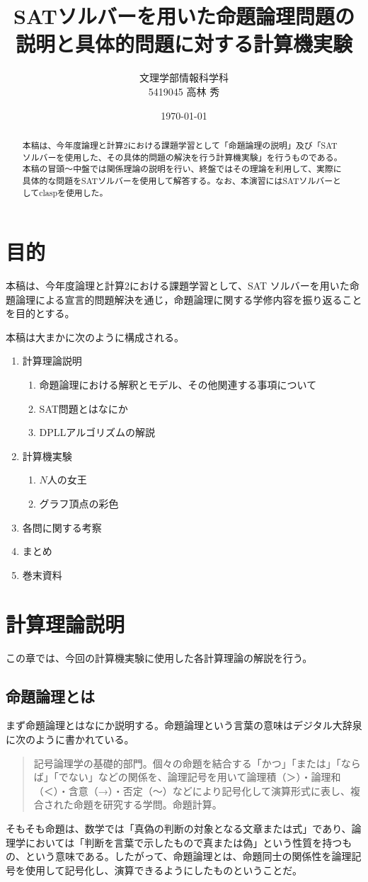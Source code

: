 \documentclass[dvipdfmx]{jsarticle}
\title{SATソルバーを用いた命題論理問題の説明と具体的問題に対する計算機実験}
\author{文理学部情報科学科\\5419045 高林 秀}
\date{\today}
\begin{document}
\maketitle

\begin{abstract}
本稿は、今年度論理と計算2における課題学習として「命題論理の説明」及び「SATソルバーを使用した、その具体的問題の解決を行う計算機実験」を行うものである。本稿の冒頭〜中盤では関係理論の説明を行い、終盤ではその理論を利用して、実際に具体的な問題をSATソルバーを使用して解答する。なお、本演習にはSATソルバーとしてclaspを使用した。
\end{abstract}

\section{目的}
本稿は、今年度論理と計算2における課題学習として、SAT ソルバーを用いた命題論理による宣言的問題解決を通じ，命題論理に関する学修内容を振り返ることを目的とする。\par
本稿は大まかに次のように構成される。
\begin{enumerate}
  \item 計算理論説明
  \begin{enumerate}
    \item 命題論理における解釈とモデル、その他関連する事項について
    \item SAT問題とはなにか
    \item DPLLアルゴリズムの解説
  \end{enumerate}
  \item 計算機実験
  \begin{enumerate}
    \item $N$人の女王
    \item グラフ頂点の彩色
  \end{enumerate}
  \item 各問に関する考察
  \item まとめ
  \item 巻末資料
\end{enumerate}
\section{計算理論説明}
この章では、今回の計算機実験に使用した各計算理論の解説を行う。
  \subsection{命題論理とは}
  まず命題論理とはなにか説明する。命題論理という言葉の意味はデジタル大辞泉に次のように書かれている。
  \begin{quote}
    記号論理学の基礎的部門。個々の命題を結合する「かつ」「または」「ならば」「でない」などの関係を、論理記号を用いて論理積（＞）・論理和（＜）・含意（→）・否定（～）などにより記号化して演算形式に表し、複合された命題を研究する学問。命題計算。
  \end{quote}
  そもそも命題は、数学では「真偽の判断の対象となる文章または式」であり、論理学においては「判断を言葉で示したもので真または偽」という性質を持つもの、という意味である。したがって、命題論理とは、命題同士の関係性を論理記号を使用して記号化し、演算できるようにしたものということだ。\par
\end{document}
